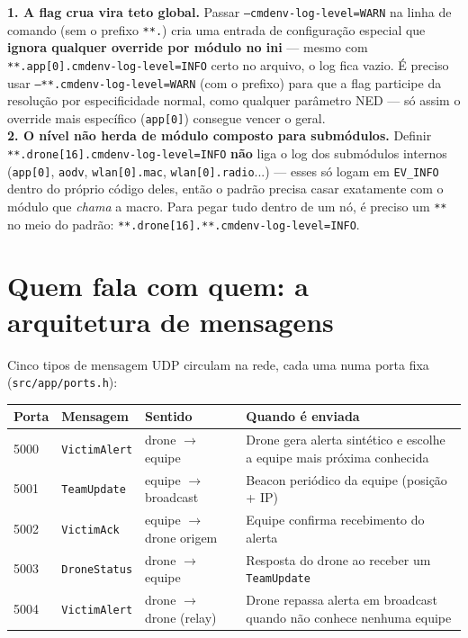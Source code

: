 \documentclass[11pt,a4paper]{article}
\begin{document}
\begin{explica}
\textbf{1. A flag crua vira teto global.} Passar
\texttt{--cmdenv-log-level=WARN} na linha de comando (sem o prefixo
\texttt{**.}) cria uma entrada de configuração especial que \textbf{ignora
qualquer override por módulo no ini} --- mesmo com
\texttt{**.app[0].cmdenv-log-level=INFO} certo no arquivo, o log fica
vazio. É preciso usar \texttt{--**.cmdenv-log-level=WARN} (com o prefixo)
para que a flag participe da resolução por especificidade normal, como
qualquer parâmetro NED --- só assim o override mais específico
(\texttt{app[0]}) consegue vencer o geral. \\[4pt]
\textbf{2. O nível não herda de módulo composto para submódulos.} Definir
\texttt{**.drone[16].cmdenv-log-level=INFO} \textbf{não} liga o log dos
submódulos internos (\texttt{app[0]}, \texttt{aodv}, \texttt{wlan[0].mac},
\texttt{wlan[0].radio}...) --- esses só logam em \texttt{EV\_INFO} dentro do
próprio código deles, então o padrão precisa casar exatamente com o módulo
que \emph{chama} a macro. Para pegar tudo dentro de um nó, é preciso um
\texttt{**} no meio do padrão: \texttt{**.drone[16].**.cmdenv-log-level=INFO}.
\end{explica}

\newpage
\section{Quem fala com quem: a arquitetura de mensagens}

Cinco tipos de mensagem UDP circulam na rede, cada uma numa porta fixa
(\texttt{src/app/ports.h}):

\begin{center}
\begin{tabular}{@{}lllp{6.2cm}@{}}
\toprule
\textbf{Porta} & \textbf{Mensagem} & \textbf{Sentido} & \textbf{Quando é enviada} \\
\midrule
5000 & \texttt{VictimAlert} & drone $\to$ equipe & Drone gera alerta sintético e escolhe a equipe mais próxima conhecida \\
5001 & \texttt{TeamUpdate}  & equipe $\to$ broadcast & Beacon periódico da equipe (posição + IP) \\
5002 & \texttt{VictimAck}   & equipe $\to$ drone origem & Equipe confirma recebimento do alerta \\
5003 & \texttt{DroneStatus} & drone $\to$ equipe & Resposta do drone ao receber um \texttt{TeamUpdate} \\
5004 & \texttt{VictimAlert} & drone $\to$ drone (relay) & Drone repassa alerta em broadcast quando não conhece nenhuma equipe \\
\bottomrule
\end{tabular}
\end{center}
\end{document}
